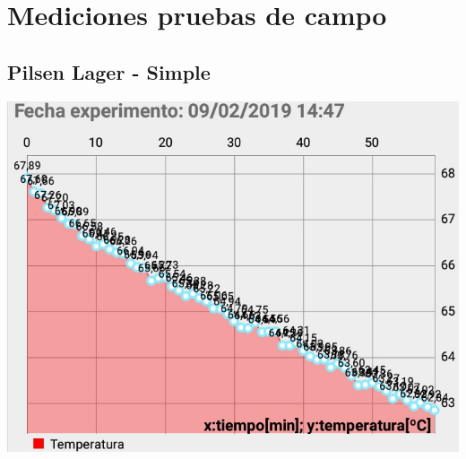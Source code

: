     \chapter{Mediciones pruebas de campo}
    \label{GraficasPruebasCampo}
    \begin{minipage}{\textwidth}
    \section{Pilsen Lager - Simple}
                \centering
                \includegraphics[scale=0.65]{Pruebas/SimpleExp1.jpg}
                \label{fig:SimpTempExp1}
    \end{minipage}     
